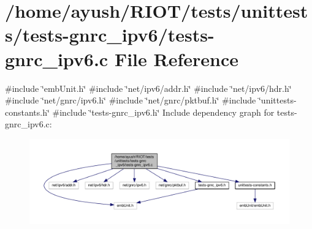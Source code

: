 \hypertarget{tests-gnrc__ipv6_8c}{}\section{/home/ayush/\+R\+I\+O\+T/tests/unittests/tests-\/gnrc\+\_\+ipv6/tests-\/gnrc\+\_\+ipv6.c File Reference}
\label{tests-gnrc__ipv6_8c}
{\ttfamily \#include \char`\"{}emb\+Unit.\+h\char`\"{}}\newline
{\ttfamily \#include \char`\"{}net/ipv6/addr.\+h\char`\"{}}\newline
{\ttfamily \#include \char`\"{}net/ipv6/hdr.\+h\char`\"{}}\newline
{\ttfamily \#include \char`\"{}net/gnrc/ipv6.\+h\char`\"{}}\newline
{\ttfamily \#include \char`\"{}net/gnrc/pktbuf.\+h\char`\"{}}\newline
{\ttfamily \#include \char`\"{}unittests-\/constants.\+h\char`\"{}}\newline
{\ttfamily \#include \char`\"{}tests-\/gnrc\+\_\+ipv6.\+h\char`\"{}}\newline
Include dependency graph for tests-\/gnrc\+\_\+ipv6.c\+:
\nopagebreak
\begin{figure}[H]
\begin{center}
\leavevmode
\includegraphics[width=350pt]{tests-gnrc__ipv6_8c__incl}
\end{center}
\end{figure}
